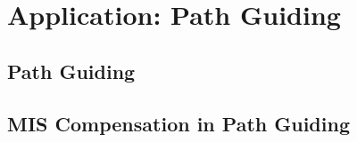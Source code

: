 \chapter{Application: Path Guiding}
\label{ch:application_pg}

\section{Path Guiding}
\label{sec:path_guiding}

\section{MIS Compensation in Path Guiding}
\label{sec:misc_path_guiding}
